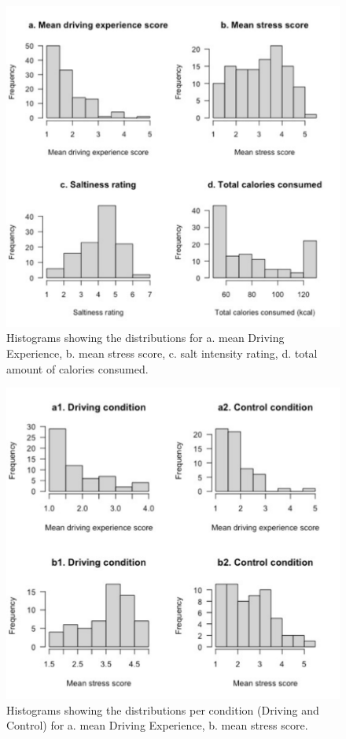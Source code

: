 \documentclass[authordate, empirical]{jote-new-article}
\begin{document}
\begin{figure}[h!]

  \includegraphics[width=.8\textwidth]{media/image3.pdf}
  \centering
  \caption{Histograms showing the distributions for a. mean Driving Experience, b. mean stress score, c. salt intensity rating, d. total amount of calories consumed.}

  \label{fig:rId25}
\end{figure}

\begin{figure}
  \centering
  \includegraphics[width=.7\textwidth]{media/image4.pdf}
  \caption{Histograms showing the distributions per condition (Driving and Control) for a. mean Driving Experience, b. mean stress score.}

  \label{fig:rId26}

\end{figure}
\end{document}

